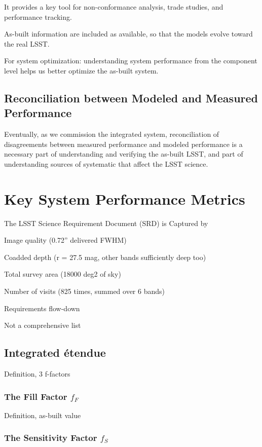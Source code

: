 It provides a key tool for non-conformance analysis, trade studies, and performance tracking.

As-built information are included as available, so that the models evolve toward the real LSST.

For system optimization: understanding system performance from the component level helps us better optimize the as-built system.

\subsection{Reconciliation between Modeled and Measured Performance}
Eventually, as we commission the integrated system, reconciliation of disagreements between measured performance
and modeled performance is a necessary part of understanding and verifying the as-built LSST,
and part of understanding sources of systematic that affect the LSST science.

\section{Key System Performance Metrics}

The LSST Science Requirement Document (SRD) is Captured by

Image quality (0.72” delivered FWHM)

Coadded depth (r = 27.5 mag, other bands sufficiently deep too)

Total survey area (18000 deg2 of sky)

Number of visits (825 times, summed over 6 bands)

Requirements flow-down

Not a comprehensive list

\subsection{Integrated \'etendue}

Definition, 3 f-factors

\subsubsection{The Fill Factor $f_F$}

Definition, as-built value

\subsubsection{The Sensitivity Factor $f_S$}


